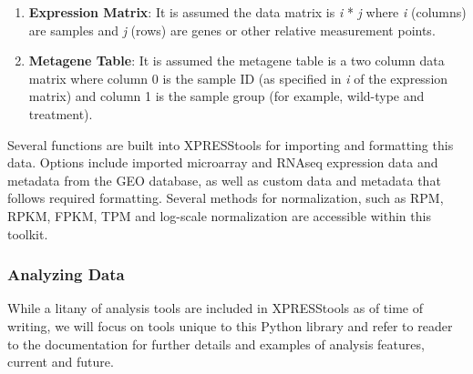 \documentclass[11pt, a4paper, oneside]{article}
\begin{document}
\begin{enumerate}
  \item \textbf{Expression Matrix}: It is assumed the data matrix is \textit{i} * \textit{j} where \textit{i} (columns) are samples and \textit{j} (rows) are genes or other relative measurement points.
  \item \textbf{Metagene Table}: It is assumed the metagene table is a two column data matrix where column 0 is the sample ID (as specified in \textit{i} of the expression matrix) and column 1 is the sample group (for example, wild-type and treatment).
\end{enumerate}

Several functions are built into XPRESStools for importing and formatting this data. Options include imported microarray and RNAseq expression data and metadata from the GEO database, as well as custom data and metadata that follows required formatting. Several methods for normalization, such as RPM, RPKM, FPKM, TPM and log-scale normalization are accessible within this toolkit.

\subsubsection{Analyzing Data}

While a litany of analysis tools are included in XPRESStools as of time of writing, we will focus on tools unique to this Python library and refer to reader to the documentation for further details and examples of analysis features, current and future.
\end{document}
